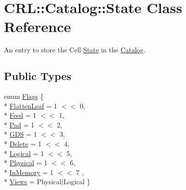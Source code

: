 \hypertarget{classCRL_1_1Catalog_1_1State}{\section{C\-R\-L\-:\-:Catalog\-:\-:State Class Reference}
\label{classCRL_1_1Catalog_1_1State}
}


An entry to store the Cell \hyperlink{classCRL_1_1Catalog_1_1State}{State} in the \hyperlink{classCRL_1_1Catalog}{Catalog}.  


\subsection*{Public Types}
\begin{DoxyCompactItemize}
\item 
enum \hyperlink{classCRL_1_1Catalog_1_1State_a625003526d38ac7500b4ad7de35e2d74}{Flags} \{ \\*
\hyperlink{classCRL_1_1Catalog_1_1State_a625003526d38ac7500b4ad7de35e2d74a496651784f48e1dc9690ff484f90477c}{Flatten\-Leaf} = 1 $<$$<$ 0, 
\\*
\hyperlink{classCRL_1_1Catalog_1_1State_a625003526d38ac7500b4ad7de35e2d74a2b7599c1303429830c8d3e6b673b3cb1}{Feed} = 1 $<$$<$ 1, 
\\*
\hyperlink{classCRL_1_1Catalog_1_1State_a625003526d38ac7500b4ad7de35e2d74a2e2b8b775bb6e8d8d12500426a01e38b}{Pad} = 1 $<$$<$ 2, 
\\*
\hyperlink{classCRL_1_1Catalog_1_1State_a625003526d38ac7500b4ad7de35e2d74a98da2efe9c180f68f009836d1179cc4a}{G\-D\-S} = 1 $<$$<$ 3, 
\\*
\hyperlink{classCRL_1_1Catalog_1_1State_a625003526d38ac7500b4ad7de35e2d74ae8f1bee3750e1fa0c1d8097a28ee49da}{Delete} = 1 $<$$<$ 4, 
\\*
\hyperlink{classCRL_1_1Catalog_1_1State_a625003526d38ac7500b4ad7de35e2d74a39170df01b13e1845db6eef82cc41b33}{Logical} = 1 $<$$<$ 5, 
\\*
\hyperlink{classCRL_1_1Catalog_1_1State_a625003526d38ac7500b4ad7de35e2d74ae166fbe3aa47f42ea93b2624b2ffed7d}{Physical} = 1 $<$$<$ 6, 
\\*
\hyperlink{classCRL_1_1Catalog_1_1State_a625003526d38ac7500b4ad7de35e2d74a1f8f15ecd43109bcc463970d8acc03fd}{In\-Memory} = 1 $<$$<$ 7
, \\*
\hyperlink{classCRL_1_1Catalog_1_1State_a625003526d38ac7500b4ad7de35e2d74a6b88bbc27f9989a35a1e00772e157b35}{Views} = Physical$|$\-Logical
 \}
\end{DoxyCompactItemize}
